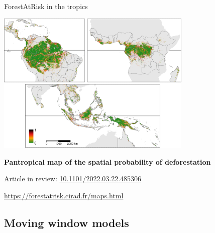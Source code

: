\documentclass[10pt,table,dvipsnames,compress]{beamer}
\begin{document}
\begin{frame}[label={sec:org0624b06}]{ForestAtRisk in the tropics}
\begin{center}
\includegraphics[width=0.7\textwidth]{figs/article/prob.png}
\end{center}

\textbf{Pantropical map of the spatial probability of deforestation}

Article in review: \href{https://doi.org/10.1101/2022.03.22.485306}{10.1101/2022.03.22.485306}

\url{https://forestatrisk.cirad.fr/maps.html}
\end{frame}

\subsection{Moving window models}
\label{sec:orgbbb3a86}
\end{document}
